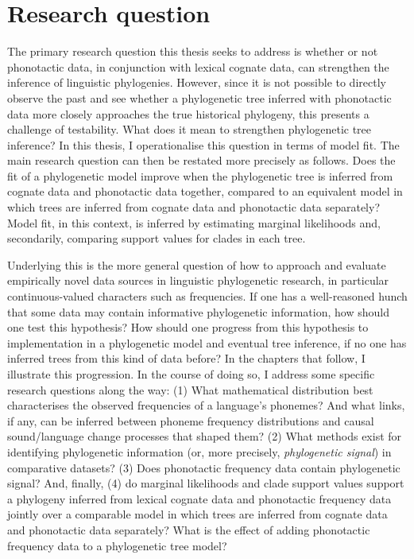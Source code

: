 \hypertarget{intro-research-question}{%
\section{Research question}\label{intro-research-question}}

The primary research question this thesis seeks to address is whether or not phonotactic data, in conjunction with lexical cognate data, can strengthen the inference of linguistic phylogenies. However, since it is not possible to directly observe the past and see whether a phylogenetic tree inferred with phonotactic data more closely approaches the true historical phylogeny, this presents a challenge of testability. What does it mean to strengthen phylogenetic tree inference? In this thesis, I operationalise this question in terms of model fit. The main research question can then be restated more precisely as follows. Does the fit of a phylogenetic model improve when the phylogenetic tree is inferred from cognate data and phonotactic data together, compared to an equivalent model in which trees are inferred from cognate data and phonotactic data separately? Model fit, in this context, is inferred by estimating marginal likelihoods and, secondarily, comparing support values for clades in each tree.

Underlying this is the more general question of how to approach and evaluate empirically novel data sources in linguistic phylogenetic research, in particular continuous-valued characters such as frequencies. If one has a well-reasoned hunch that some data may contain informative phylogenetic information, how should one test this hypothesis? How should one progress from this hypothesis to implementation in a phylogenetic model and eventual tree inference, if no one has inferred trees from this kind of data before? In the chapters that follow, I illustrate this progression. In the course of doing so, I address some specific research questions along the way: (1) What mathematical distribution best characterises the observed frequencies of a language's phonemes? And what links, if any, can be inferred between phoneme frequency distributions and causal sound/language change processes that shaped them? (2) What methods exist for identifying phylogenetic information (or, more precisely, \emph{phylogenetic signal}) in comparative datasets? (3) Does phonotactic frequency data contain phylogenetic signal? And, finally, (4) do marginal likelihoods and clade support values support a phylogeny inferred from lexical cognate data and phonotactic frequency data jointly over a comparable model in which trees are inferred from cognate data and phonotactic data separately? What is the effect of adding phonotactic frequency data to a phylogenetic tree model?

